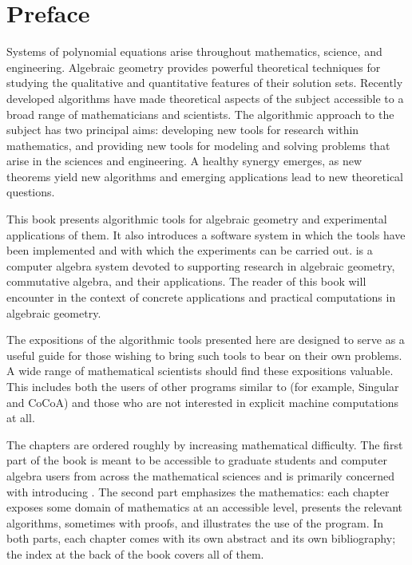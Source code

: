 
\chapter*{Preface}

\bgroup

Systems of polynomial equations arise throughout mathematics, science, and
engineering.
Algebraic geometry provides powerful theoretical techniques for
studying the qualitative and quantitative features of their solution sets.
Recently developed algorithms have made theoretical aspects of the subject
accessible to a broad range of mathematicians and scientists.
The algorithmic approach to the subject has two
principal aims: developing new tools for research within mathematics,
and providing new tools for modeling and solving problems
that arise in the sciences and engineering.  A healthy
synergy emerges, as new theorems yield new algorithms and emerging
applications lead to new theoretical questions.

This book presents algorithmic tools for algebraic geometry and experimental 
applications of them.  It also introduces a
software system in which
the tools have been implemented and with which the experiments can
be carried out.  \Mtwo is a computer
algebra system devoted to supporting research in algebraic geometry,
commutative algebra, and their applications. 
The reader of this book will encounter \Mtwo in the context of concrete
applications and
practical computations in algebraic geometry.  

The expositions of the algorithmic tools presented here are designed to serve
as a useful guide for those wishing to bring such tools to bear on their own
problems.
A wide range of mathematical scientists should find these expositions valuable.
This includes both the users of other programs
similar to \Mtwo (for example, Singular and CoCoA) and those who
are not interested in explicit machine computations at all.  

The chapters are ordered roughly by increasing mathematical
difficulty. The first part of the book is meant to be accessible to
graduate students and computer algebra users from across the
mathematical sciences and is primarily concerned
with introducing \Mtwo.  The second part emphasizes the
mathematics: each chapter exposes some domain of mathematics at an
accessible level, presents the relevant algorithms, sometimes with
proofs, and illustrates the use of the program.  In both parts, each chapter comes with
its own abstract and its own bibliography; the index at the back of
the book covers all of them.

